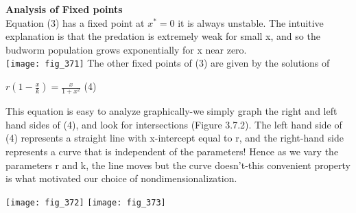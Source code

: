 \documentclass{article}
\newcommand\tab[1][1cm]{\hspace*{#1}}
\begin{document}
\textbf {Analysis of Fixed points}
\\ \tab Equation (3) has a fixed point at $x^{*}=0$ it is always unstable. The intuitive explanation is that the predation is extremely weak for small x, and so the budworm population grows exponentially for x near zero. \\ 
\texttt{[image: fig\_371]} \tab
The other fixed points of (3) are given by the solutions of
\begin{center}
$r(1-\frac{x}{k})=\frac{x}{1+x^{2}}$ \tab (4)
\end{center}

This equation is easy to analyze graphically-we simply graph the right and left hand sides of (4), and look for intersections (Figure 3.7.2). The left hand side of (4) represents a straight line with x-intercept equal to r, and the right-hand side represents a curve that is independent of the parameters! Hence as we vary the parameters r and k, the line moves but the curve doesn't-this convenient property is what motivated our choice of nondimensionalization.

\texttt{[image: fig\_372]}
\texttt{[image: fig\_373]}
\end{document}
